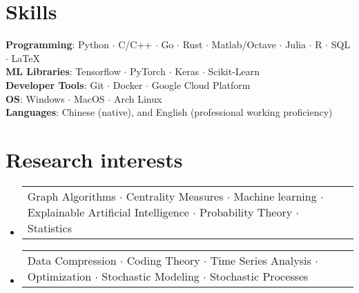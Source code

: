 \documentclass[letterpaper,10pt]{article}
\makeatletter
\newcommand{\resumeProjectHeading}[2]{
  \item
  \begin{tabular*}{0.97\textwidth}{l@{\extracolsep{\fill}}r}
    \small#1 & #2 \\
  \end{tabular*}\vspace{-7pt}
}
\newenvironment{resumeSubHeadingList}{\begin{itemize}[leftmargin=0.15in, label={}]}{\end{itemize}}
\makeatother
\begin{document}
\section{Skills}
\begin{itemize}[leftmargin=0.15in, label={}]
  \small{\item{
        \textbf{Programming}{: Python $\cdot$ C/C++ $\cdot$ Go $\cdot$ Rust $\cdot$ Matlab/Octave $\cdot$ Julia $\cdot$ R $\cdot$ SQL $\cdot$ \LaTeX} \\
        \textbf{ML Libraries}{: Tensorflow $\cdot$  PyTorch $\cdot$ Keras $\cdot$  Scikit-Learn} \\
        \textbf{Developer Tools}{: Git $\cdot$ Docker $\cdot$  Google Cloud Platform} \\
        \textbf{OS}{: Windows $\cdot$ MacOS $\cdot$ Arch Linux} \\
        \textbf{Languages}{: Chinese (native), and English (professional working proficiency)}
        }}
\end{itemize}

\section{Research interests}
\begin{resumeSubHeadingList}
  \resumeProjectHeading{
    Graph Algorithms $\cdot$ Centrality Measures $\cdot$ Machine learning
    $\cdot$ Explainable Artificial Intelligence $\cdot$ Probability Theory
    $\cdot$ Statistics}{}
  \resumeProjectHeading{
    Data Compression $\cdot$ Coding Theory $\cdot$ Time Series Analysis $\cdot$
    Optimization $\cdot$ Stochastic Modeling $\cdot$ Stochastic Processes}{}
\end{resumeSubHeadingList}
\end{document}
